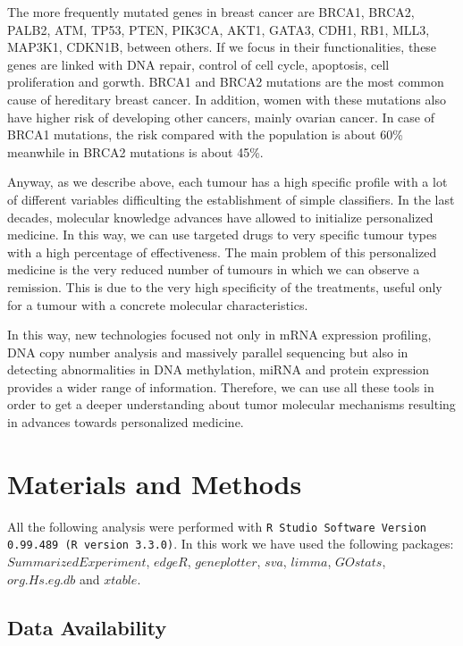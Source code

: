 \documentclass[9pt,twocolumn,twoside]{gsajnl}
\begin{document}
The more frequently mutated genes in breast cancer are BRCA1, BRCA2, PALB2, ATM, TP53, PTEN, PIK3CA, AKT1, GATA3, CDH1, RB1, MLL3, MAP3K1, CDKN1B, between others\citep{acs}. If we focus in their functionalities, these genes are linked with DNA repair, control of cell cycle, apoptosis, cell proliferation and gorwth. BRCA1 and BRCA2 mutations are the most common cause of hereditary breast cancer\citep{acs}. In addition, women with these mutations also have higher risk of developing other cancers, mainly ovarian cancer\citep{acs}. In case of BRCA1 mutations, the risk compared with the population is about 60\% meanwhile in BRCA2 mutations is about 45\%\citep{acs}. 
\vspace{2 mm}

Anyway, as we describe above, each tumour has a high specific profile with a lot of different variables difficulting the establishment of simple classifiers. In the last decades, molecular knowledge advances have allowed to initialize personalized medicine. In this way, we can use targeted drugs to very specific tumour types with a high percentage of effectiveness. The main problem of this personalized medicine is the very reduced number of tumours in which we can observe a remission. This is due to the very high specificity of the treatments, useful only for a tumour with a concrete molecular characteristics. 

\vspace{2 mm}

In this way, new technologies focused not only in mRNA expression profiling, DNA copy number analysis and massively parallel sequencing but also in detecting abnormalities in DNA methylation, miRNA and protein expression provides a wider range of information\citep{cangen}. Therefore, we can use all these tools in order to get a deeper understanding about tumor molecular mechanisms resulting in advances towards personalized medicine.

\section*{Materials and Methods}
All the following analysis were performed with \verb+R Studio Software Version 0.99.489 (R version 3.3.0)+. In this work we have used the following packages: $SummarizedExperiment$, $edgeR$, $geneplotter$, $sva$, $limma$, $GOstats$, $org.Hs.eg.db$ and $xtable$.

\subsection*{Data Availability}
\vspace{2 mm}
\end{document}
